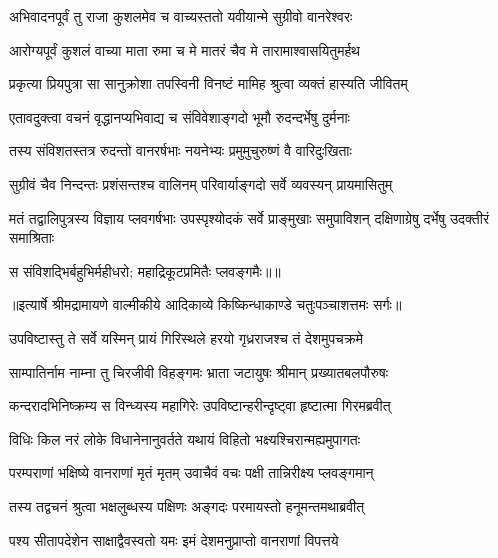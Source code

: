 \twolineshloka
{अभिवादनपूर्वं तु राजा कुशलमेव च}
{वाच्यस्ततो यवीयान्मे सुग्रीवो वानरेश्वरः} %

\twolineshloka
{आरोग्यपूर्वं कुशलं वाच्या माता रुमा च मे}
{मातरं चैव मे तारामाश्वासयितुमर्हथ} %

\twolineshloka
{प्रकृत्या प्रियपुत्रा सा सानुक्रोशा तपस्विनी}
{विनष्टं मामिह श्रुत्वा व्यक्तं हास्यति जीवितम्} %

\twolineshloka
{एतावदुक्त्वा वचनं वृद्धानप्यभिवाद्य च}
{संविवेशाङ्गदो भूमौ रुदन्दर्भेषु दुर्मनाः} %

\twolineshloka
{तस्य संविशतस्तत्र रुदन्तो वानरर्षभाः}
{नयनेभ्यः प्रमुमुचुरुष्णं वै वारिदुःखिताः} %

\twolineshloka
{सुग्रीवं चैव निन्दन्तः प्रशंसन्तश्च वालिनम्}
{परिवार्याङ्गदो सर्वे व्यवस्यन् प्रायमासितुम्} %

\threelineshloka
{मतं तद्वालिपुत्रस्य विज्ञाय प्लवगर्षभाः}
{उपस्पृश्योदकं सर्वे प्राङ्मुखाः समुपाविशन्}
{दक्षिणाग्रेषु दर्भेषु उदक्तीरं समाश्रिताः} %

{स संविशद्भिर्बहुभिर्महीधरो; महाद्रिकूटप्रमितैः प्लवङ्गमैः॥॥} %

\addtocounter{shlokacount}{1}


{॥इत्यार्षे श्रीमद्रामायणे वाल्मीकीये आदिकाव्ये किष्किन्धाकाण्डे चतुःपञ्चाशत्तमः सर्गः॥}


\twolineshloka
{उपविष्टास्तु ते सर्वे यस्मिन् प्रायं गिरिस्थले}
{हरयो गृध्रराजश्च तं देशमुपचक्रमे} %

\twolineshloka
{साम्पातिर्नाम नाम्ना तु चिरजीवी विहङ्गमः}
{भ्राता जटायुषः श्रीमान् प्रख्यातबलपौरुषः} %

\twolineshloka
{कन्दरादभिनिष्क्रम्य स विन्ध्यस्य महागिरेः}
{उपविष्टान्हरीन्दृष्ट्वा हृष्टात्मा गिरमब्रवीत्} %

\twolineshloka
{विधिः किल नरं लोके विधानेनानुवर्तते}
{यथायं विहितो भक्ष्यश्चिरान्मह्यमुपागतः} %

\twolineshloka
{परम्पराणां भक्षिष्ये वानराणां मृतं मृतम्}
{उवाचैवं वचः पक्षी तान्निरीक्ष्य प्लवङ्गमान्} %

\twolineshloka
{तस्य तद्वचनं श्रुत्वा भक्षलुब्धस्य पक्षिणः}
{अङ्गदः परमायस्तो हनूमन्तमथाब्रवीत्} %

\twolineshloka
{पश्य सीतापदेशेन साक्षाद्वैवस्वतो यमः}
{इमं देशमनुप्राप्तो वानराणां विपत्तये} %

